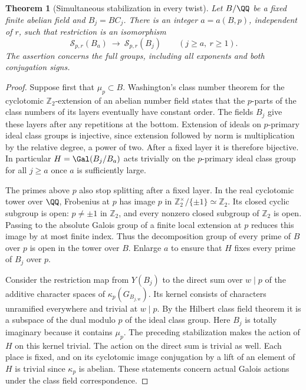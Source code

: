 \documentclass[a4paper,11pt]{article}
\newtheorem{theorem}[proposition]{Theorem}
\theoremstyle{definition}
\theoremstyle{remark}
\newcommand{\ZZ}{\mathbb Z}\newcommand{\ord}{\operatorname{ord}}
\numberwithin{equation}{section}
\newcommand{\Sel}{\mathcal S}
\begin{document}
\begin{theorem}[Simultaneous stabilization in every twist]\label{thm:stable27}
Let \(B/\QQ\) be a fixed finite abelian field and \(B_j=BC_j\). There is an integer \(a=a(B,p)\), independent of \(r\), such that restriction is an isomorphism
\[
       \Sel_{p,r}(B_a)\ \longrightarrow\ \Sel_{p,r}(B_j)
       \qquad(j\ge a,\ r\ge1).
\]
The assertion concerns the full groups, including all exponents and both conjugation signs.
\end{theorem}
\begin{proof}
Suppose first that \(\mu_p\subset B\). Washington's class number theorem for the cyclotomic \(\ZZ_2\)-extension of an abelian number field states that the \(p\)-parts of the class numbers of its layers eventually have constant order. The fields \(B_j\) give these layers after any repetitions at the bottom. Extension of ideals on \(p\)-primary ideal class groups is injective, since extension followed by norm is multiplication by the relative degree, a power of two. After a fixed layer it is therefore bijective. In particular \(H=\Gal(B_j/B_a)\) acts trivially on the \(p\)-primary ideal class group for all \(j\ge a\) once \(a\) is sufficiently large.~\cite{IV-II-III-wash27}

The primes above \(p\) also stop splitting after a fixed layer. In the real cyclotomic tower over \(\QQ\), Frobenius at \(p\) has image \(p\) in \(\ZZ_2^\times/\{\pm1\}\simeq\ZZ_2\). Its closed cyclic subgroup is open: \(p\ne \pm1\) in \(\ZZ_2\), and every nonzero closed subgroup of \(\ZZ_2\) is open. Passing to the absolute Galois group of a finite local extension at \(p\) reduces this image by at most finite index. Thus the decomposition group of every prime of \(B\) over \(p\) is open in the tower over \(B\). Enlarge \(a\) to ensure that \(H\) fixes every prime of \(B_j\) over \(p\).

Consider the restriction map from \(Y(B_j)\) to the direct sum over \(w\mid p\) of the additive character spaces of \(\kappa_p(G_{B_{j,w}})\). Its kernel consists of characters unramified everywhere and trivial at \(w\mid p\). By the Hilbert class field theorem it is a subspace of the dual modulo \(p\) of the ideal class group. Here \(B_j\) is totally imaginary because it contains \(\mu_p\). The preceding stabilization makes the action of \(H\) on this kernel trivial. The action on the direct sum is trivial as well. Each place is fixed, and on its cyclotomic image conjugation by a lift of an element of \(H\) is trivial since \(\kappa_p\) is abelian. These statements concern actual Galois actions under the class field correspondence.


\end{proof}
\end{document}
